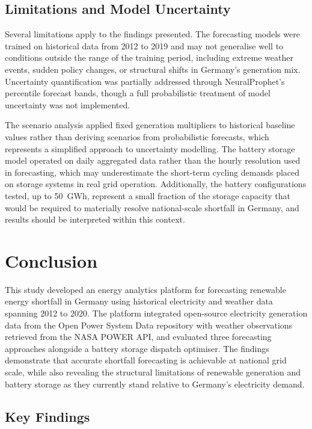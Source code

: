 \documentclass[conference]{IEEEtran}
\begin{document}
\subsection{Limitations and Model Uncertainty}
 
Several limitations apply to the findings presented. The forecasting models were trained on historical data from 2012 to 2019 and may not generalise well to conditions outside the range of the training period, including extreme weather events, sudden policy changes, or structural shifts in Germany's generation mix. Uncertainty quantification was partially addressed through NeuralProphet's percentile forecast bands, though a full probabilistic treatment of model uncertainty was not implemented.
 
The scenario analysis applied fixed generation multipliers to historical baseline values rather than deriving scenarios from probabilistic forecasts, which represents a simplified approach to uncertainty modelling. The battery storage model operated on daily aggregated data rather than the hourly resolution used in forecasting, which may underestimate the short-term cycling demands placed on storage systems in real grid operation. Additionally, the battery configurations tested, up to 50~GWh, represent a small fraction of the storage capacity that would be required to materially resolve national-scale shortfall in Germany, and results should be interpreted within this context.



\section{Conclusion}
 
This study developed an energy analytics platform for forecasting renewable energy shortfall in Germany using historical electricity and weather data spanning 2012 to 2020. The platform integrated open-source electricity generation data from the Open Power System Data repository with weather observations retrieved from the NASA POWER API, and evaluated three forecasting approaches alongside a battery storage dispatch optimiser. The findings demonstrate that accurate shortfall forecasting is achievable at national grid scale, while also revealing the structural limitations of renewable generation and battery storage as they currently stand relative to Germany's electricity demand.
 
\subsection{Key Findings}
 
\end{document}
